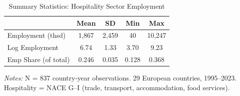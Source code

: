 \begin{table}[H]
\centering
\caption{Summary Statistics: Hospitality Sector Employment}
\label{tab:summary}
\small
\begin{threeparttable}
\begin{tabular}{lcccc}
\toprule
& Mean & SD & Min & Max \\
\midrule
Employment (thsd) & 1,867 & 2,459 & 40 & 10,247 \\
Log Employment & 6.74 & 1.33 & 3.70 & 9.23 \\
Emp Share (of total) & 0.246 & 0.035 & 0.128 & 0.368 \\
\bottomrule
\end{tabular}
\begin{tablenotes}[flushleft]
\footnotesize
\item \textit{Notes:} N = 837 country-year observations. 29 European countries, 1995--2023. Hospitality = NACE G--I (trade, transport, accommodation, food services).
\end{tablenotes}
\end{threeparttable}
\end{table}
